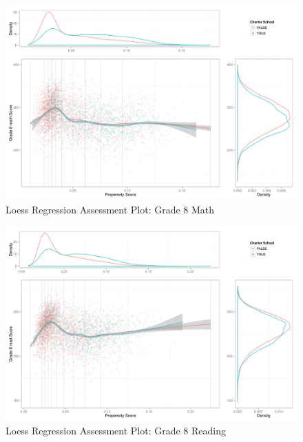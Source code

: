 \begin{figure}[h!]
\begin{center}
\includegraphics[height=.4\textheight]{../Figures2009/g8math-loess.pdf}
\caption{Loess Regression Assessment Plot: Grade 8 Math}
\label{fig:g8math:loess}
\end{center}
\end{figure}

\begin{figure}[h!]
\begin{center}
\includegraphics[height=.4\textheight]{../Figures2009/g8read-loess.pdf}
\caption{Loess Regression Assessment Plot: Grade 8 Reading}
\label{fig:g8read:loess}
\end{center}
\end{figure}

